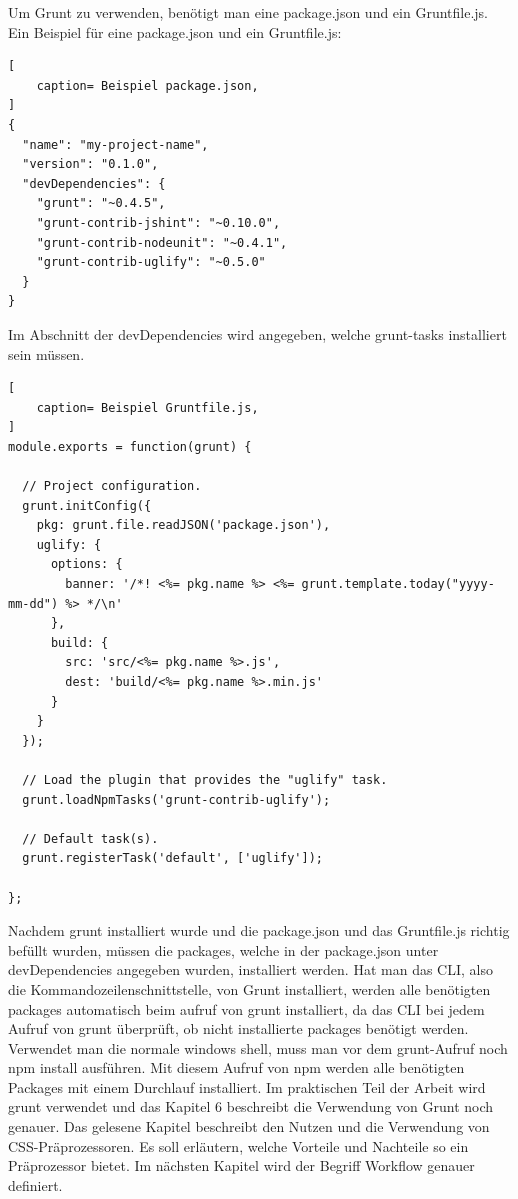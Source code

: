 Um Grunt zu verwenden, benötigt man eine package.json und ein Gruntfile.js.\newline
Ein Beispiel für eine package.json und ein Gruntfile.js:
\begin{lstlisting}[
	caption= Beispiel package.json,
]
{
  "name": "my-project-name",
  "version": "0.1.0",
  "devDependencies": {
    "grunt": "~0.4.5",
    "grunt-contrib-jshint": "~0.10.0",
    "grunt-contrib-nodeunit": "~0.4.1",
    "grunt-contrib-uglify": "~0.5.0"
  }
}
\end{lstlisting}
Im Abschnitt der \glqq{}devDependencies\grqq{} wird angegeben, welche grunt-tasks installiert sein müssen. 
\begin{lstlisting}[
	caption= Beispiel Gruntfile.js,
]
module.exports = function(grunt) {

  // Project configuration.
  grunt.initConfig({
    pkg: grunt.file.readJSON('package.json'),
    uglify: {
      options: {
        banner: '/*! <%= pkg.name %> <%= grunt.template.today("yyyy-mm-dd") %> */\n'
      },
      build: {
        src: 'src/<%= pkg.name %>.js',
        dest: 'build/<%= pkg.name %>.min.js'
      }
    }
  });

  // Load the plugin that provides the "uglify" task.
  grunt.loadNpmTasks('grunt-contrib-uglify');

  // Default task(s).
  grunt.registerTask('default', ['uglify']);

};
\end{lstlisting}
Nachdem grunt installiert wurde und die package.json und das Gruntfile.js richtig befüllt wurden, müssen die packages, welche in der package.json unter \glqq{}devDependencies\grqq{} angegeben wurden, installiert werden. \newline
Hat man das CLI, also die Kommandozeilenschnittstelle, von Grunt installiert, werden alle benötigten packages automatisch beim aufruf von grunt installiert, da das CLI bei jedem Aufruf von grunt überprüft, ob nicht installierte packages benötigt werden.\newline
Verwendet man die normale windows shell, muss man vor dem grunt-Aufruf noch \glq{}npm install\grq{}  ausführen. Mit diesem Aufruf von npm werden alle benötigten Packages mit einem Durchlauf installiert.\newline
Im praktischen Teil der Arbeit wird grunt verwendet und das Kapitel 6 beschreibt die Verwendung von Grunt noch genauer.\newline
Das gelesene Kapitel beschreibt den Nutzen und die Verwendung von CSS-Präprozessoren. Es soll erläutern, welche Vorteile und Nachteile so ein Präprozessor bietet. Im nächsten Kapitel wird der Begriff Workflow genauer definiert.
